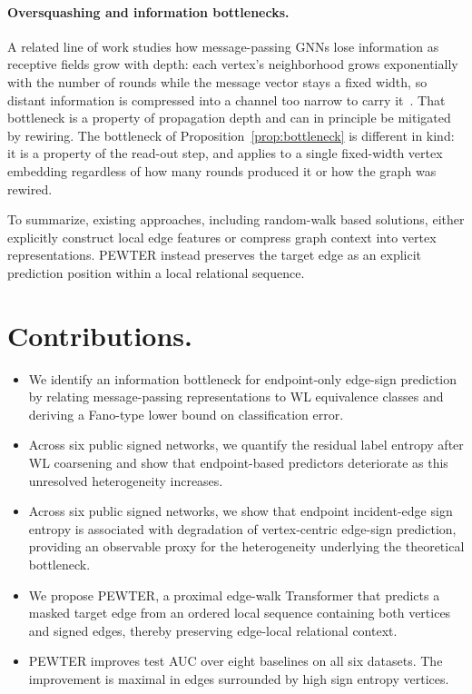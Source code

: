 \documentclass[sigconf, review, anonymous]{acmart}
\theoremstyle{plain}
\theoremstyle{definition}
\begin{document}
\paragraph{Oversquashing and information bottlenecks.} A related line of work studies how message-passing GNNs lose information as receptive fields grow with depth: each vertex's neighborhood grows exponentially with the number of rounds while the message vector stays a fixed width, so distant information is compressed into a channel too narrow to carry it~\citep{alon2021bottleneck, topping2022understanding}. That bottleneck is a property of propagation depth and can in principle be mitigated by rewiring. The bottleneck of Proposition~\ref{prop:bottleneck} is different in kind: it is a property of the read-out step, and applies to a single fixed-width vertex embedding regardless of how many rounds produced it or how the graph was rewired.

To summarize, existing approaches, including random-walk based solutions, either explicitly construct local edge features or compress graph context into vertex representations. PEWTER instead preserves the target edge as an explicit prediction position within a local relational sequence.
\section{Contributions.}
\begin{itemize}
\item We identify an information bottleneck for endpoint-only edge-sign prediction by relating message-passing representations to WL equivalence classes and deriving a Fano-type lower bound on classification error.
\item Across six public signed networks, we quantify the residual label entropy after WL coarsening and show that endpoint-based predictors deteriorate as this unresolved heterogeneity increases.
\item Across six public signed networks, we show that endpoint incident-edge sign entropy is associated with degradation of vertex-centric edge-sign prediction, providing an observable proxy for the heterogeneity underlying the theoretical bottleneck.
\item We propose PEWTER, a proximal edge-walk Transformer that predicts a masked target edge from an ordered local sequence containing both vertices and signed edges, thereby preserving edge-local relational context. 
\item PEWTER improves test AUC over eight baselines on all six datasets. The improvement is maximal in edges surrounded by high sign entropy vertices.
\end{itemize}
\end{document}
